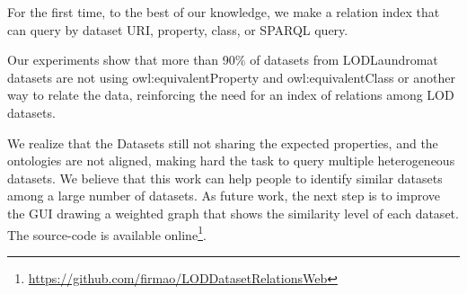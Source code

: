 For the first time, to the best of our knowledge, we make a relation index that can query by dataset URI, property, class, or SPARQL query.

Our experiments show that more than 90\% of datasets from LODLaundromat datasets are not using owl:equivalentProperty and owl:equivalentClass or another way to relate the data, reinforcing the need for an index of relations among LOD datasets.

We realize that the Datasets still not sharing the expected properties, and the ontologies are not aligned, making hard the task to query multiple heterogeneous datasets.
We believe that this work can help people to identify similar datasets among a large number of datasets.
As future work, the next step is to improve the GUI drawing a weighted graph that shows the similarity level of each dataset.
The source-code is available online\footnote{\url{https://github.com/firmao/LODDatasetRelationsWeb}}.